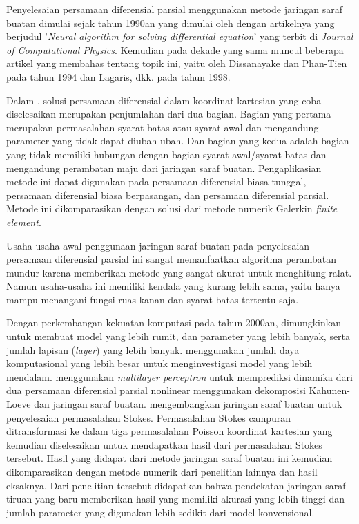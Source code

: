 Penyelesaian persamaan diferensial parsial menggunakan metode jaringan saraf buatan dimulai sejak tahun 1990an yang dimulai oleh \cite{lee_kang_1990} dengan artikelnya yang berjudul '\emph{Neural algorithm for solving differential equation}' yang terbit di \emph{Journal of Computational Physics}. Kemudian pada dekade yang sama muncul beberapa artikel yang membahas tentang topik ini, yaitu oleh Dissanayake dan Phan-Tien pada tahun 1994 dan Lagaris, dkk. pada tahun 1998. 

Dalam \citep{lagaris1998}, solusi persamaan diferensial dalam koordinat kartesian yang coba diselesaikan merupakan penjumlahan dari dua bagian. Bagian yang pertama merupakan permasalahan syarat batas atau syarat awal dan mengandung parameter yang tidak dapat diubah-ubah. Dan bagian yang kedua adalah bagian yang tidak memiliki hubungan dengan bagian syarat awal/syarat batas dan mengandung perambatan maju dari jaringan saraf buatan. Pengaplikasian metode ini dapat digunakan pada persamaan diferensial biasa tunggal, persamaan diferensial biasa berpasangan, dan persamaan diferensial parsial. Metode ini dikomparasikan dengan solusi dari metode numerik Galerkin \emph{finite element}.

Usaha-usaha awal penggunaan jaringan saraf buatan pada penyelesaian persamaan diferensial parsial ini sangat memanfaatkan algoritma perambatan mundur karena memberikan metode yang sangat akurat untuk menghitung ralat. Namun usaha-usaha ini memiliki kendala yang kurang lebih sama, yaitu hanya mampu menangani fungsi ruas kanan dan syarat batas tertentu saja.

Dengan perkembangan kekuatan komputasi pada tahun 2000an, dimungkinkan untuk membuat model yang lebih rumit, dan parameter yang lebih banyak, serta jumlah lapisan (\emph{layer}) yang lebih banyak. \cite{Smaoui2004} menggunakan jumlah daya komputasional yang lebih besar untuk menginvestigasi model yang lebih mendalam. menggunakan \emph{multilayer perceptron} untuk memprediksi dinamika dari dua persamaan diferensial parsial nonlinear menggunakan dekomposisi Kahunen-Loeve dan jaringan saraf buatan. \cite{baymani2010} mengembangkan jaringan saraf buatan untuk penyelesaian permasalahan Stokes. Permasalahan Stokes campuran ditransformasi ke dalam tiga permasalahan Poisson koordinat kartesian yang kemudian diselesaikan untuk mendapatkan hasil dari permasalahan Stokes tersebut. Hasil yang didapat dari metode jaringan saraf buatan ini kemudian dikomparasikan dengan metode numerik dari penelitian lainnya dan hasil eksaknya. Dari penelitian tersebut didapatkan bahwa pendekatan jaringan saraf tiruan yang baru memberikan hasil yang memiliki akurasi yang lebih tinggi dan jumlah parameter yang digunakan lebih sedikit dari model konvensional.

